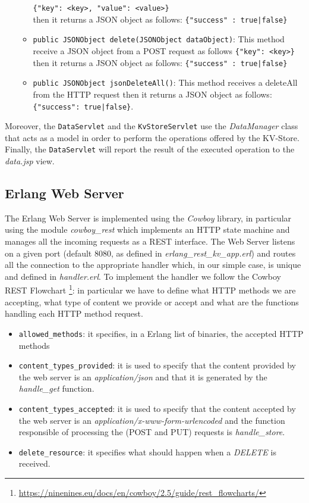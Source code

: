 \documentclass[a4paper]{article}
\begin{document}
\begin{itemize}
\begin{itemize}
        \verb!{"key": <key>, "value": <value>}!\\
        then it returns a JSON object as follows:
        \verb!{"success" : true|false}!
        \item \texttt{public JSONObject delete(JSONObject dataObject)}: This method receive a JSON object from a POST request as follows
        \verb!{"key": <key>}!
        then it returns a JSON object as follows:
        \verb!{"success" : true|false}!
        \item \texttt{public JSONObject jsonDeleteAll()}: This method receives a dele\-teAll from the HTTP request then it returns a JSON object as follows: \verb!{"success": true|false}!.
    \end{itemize}
\end{itemize}

Moreover, the \texttt{DataServlet} and the \texttt{KvStoreServlet} use the \emph{DataManager} class that acts as a model in order to perform the operations offered by the KV-Store. Finally, the \texttt{DataServlet} will report the result of the executed operation to the \emph{data.jsp} view.

\subsection{Erlang Web Server}
The Erlang Web Server is implemented using the \emph{Cowboy} library, in particular using the module \emph{cowboy\_rest} which implements an HTTP state machine and manages all the incoming requests as a REST interface.
The Web Server listens on a given port (default 8080, as defined in \emph{erlang\_rest\_kv\_app.erl}) and routes all the connection to the appropriate handler which, in our simple case, is unique and defined in \emph{handler.erl}.
To implement the handler we follow the Cowboy REST Flowchart \footnote{\url{https://ninenines.eu/docs/en/cowboy/2.5/guide/rest\_flowcharts/}}: in particular we have to define what HTTP methods we are accepting, what type of content we provide or accept and what are the functions handling each HTTP method request.

\begin{itemize}
    \item \texttt{allowed\_methods}: it specifies, in a Erlang list of binaries, 
        the accepted HTTP methods
    \item \texttt{content\_types\_provided}: it is used to specify that the content
        provided by the web server is an \emph{application/json} and that 
        it is generated by the \emph{handle\_get} function.
    \item \texttt{content\_types\_accepted}: it is used to specify that the content
        accepted by the web server is an \emph{application/x-www-form-urlencoded}
        and the function responsible of processing the (POST and PUT)
        requests is \emph{handle\_store}.
    \item \texttt{delete\_resource}: it specifies what should happen when a \emph{DELETE} is received.
\end{itemize}
\end{document}
